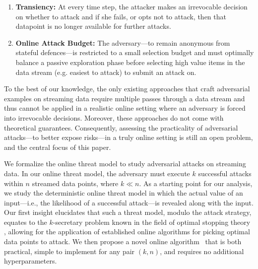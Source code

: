 \begin{enumerate}[noitemsep,topsep=0pt,parsep=0pt,partopsep=0pt, leftmargin=*] 
    \item \textbf{Transiency:} At every time step, the attacker makes an irrevocable decision on whether to attack and if she fails, or opts not to attack, then that datapoint is no longer available for further attacks.
    \item \textbf{Online Attack Budget:} The adversary---to remain anonymous from stateful defences---is restricted to a small selection budget and must optimally balance a passive exploration phase before selecting high value items in the data stream (e.g. easiest to attack) to submit an attack on.
\end{enumerate}

To the best of our knowledge, the only existing approaches that craft adversarial examples on streaming data \citep{gong2019real,lin2017tactics,sun2020stealthy} require multiple passes through a data stream and thus cannot be applied in a realistic online setting where an adversary is forced into irrevocable decisions. Moreover, these approaches do not come with theoretical guarantees. Consequently, assessing the practicality of adversarial attacks---to better expose risks---in a truly online setting is still an open problem, and the central focus of this paper. %


We formalize the online threat model to study adversarial attacks on streaming data. In our online threat model, the adversary must execute $k$ successful attacks within $n$  streamed data points, where $k \ll n$. As a starting point for our analysis, we study the deterministic online threat model in which the actual value of an input---i.e., the likelihood of a successful attack---is revealed along with the input. Our first insight elucidates that such a threat model, modulo the attack strategy, equates to the $k$-secretary problem known in the field of optimal stopping theory \cite{dynkin1963optimum,kleinberg2005multiple}, allowing for the application of established online algorithms for picking optimal data points to attack. We then propose a novel online algorithm \algoname\ that is both practical, simple to implement for any pair $(k,n)$, and requires no additional hyperparameters.%
 

